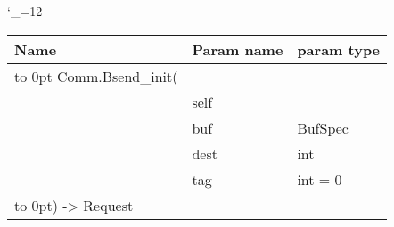 \begingroup \catcode`\_=12 \tt
\begin{tabular}{lll}
\toprule
\textrm{Name}&\textrm{Param name}&\textrm{param type}\\
\midrule
\hbox to 0pt {Comm.Bsend_init(\hss}\\
& self\\
& buf & BufSpec\\
& dest & int\\
& tag & int = 0\\
\hbox to 0pt{) -> Request\hss}\\
\bottomrule
\end{tabular}
\endgroup
